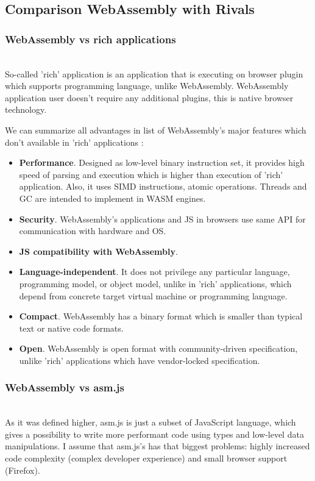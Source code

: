 \subsection{Comparison WebAssembly with Rivals}
\subsubsection{WebAssembly vs rich applications}\mbox{}\\
So-called 'rich' application is an application that is executing on browser plugin which supports programming language, unlike WebAssembly.
WebAssembly application user doesn't require any additional plugins, this is native browser technology.

We can summarize all advantages in list of WebAssembly's major features which don't available in 'rich' applications :
\begin{itemize}  
  \item \textbf{Performance}. Designed as low-level binary instruction set, it provides high speed of parsing and execution which is higher than execution of 'rich' application. 
                Also, it uses SIMD instructions, atomic operations. Threads and GC are intended to implement in WASM engines. 
  \item \textbf{Security}. WebAssembly’s applications and JS in browsers use same API for communication with hardware and OS.
  \item \textbf{JS compatibility with WebAssembly}.
  \item \textbf{Language-independent}. It does not privilege any particular language, programming model, or object model, unlike in 'rich' applications, 
                which depend from concrete target virtual machine or programming language.
  \item \textbf{Compact}. WebAssembly has a binary format which is smaller than typical text or native code formats.
  \item \textbf{Open}. WebAssembly is open format with community-driven specification, unlike 'rich' applications which have vendor-locked specification.

\end{itemize}

\subsubsection{WebAssembly vs asm.js}\mbox{}\\
\indent As it was defined higher, asm.js is just a subset of JavaScript language, which gives a possibility to write more performant code using types and low-level data manipulations.
I assume that asm.js's has that biggest problems: highly increased code complexity (complex developer experience) and small browser support (Firefox).

